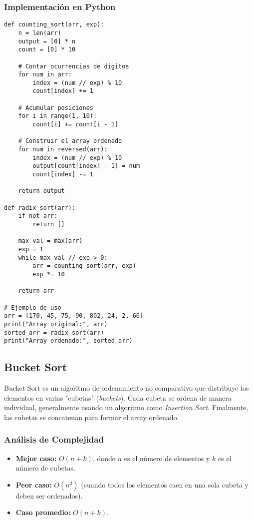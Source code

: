 \documentclass[11pt,openany]{book}
\begin{document}
\subsubsection{Implementación en Python}
\lstset{language=Python}
\begin{lstlisting}
def counting_sort(arr, exp):
    n = len(arr)
    output = [0] * n
    count = [0] * 10

    # Contar ocurrencias de digitos
    for num in arr:
        index = (num // exp) % 10
        count[index] += 1

    # Acumular posiciones
    for i in range(1, 10):
        count[i] += count[i - 1]

    # Construir el array ordenado
    for num in reversed(arr):
        index = (num // exp) % 10
        output[count[index] - 1] = num
        count[index] -= 1

    return output

def radix_sort(arr):
    if not arr:
        return []

    max_val = max(arr)
    exp = 1
    while max_val // exp > 0:
        arr = counting_sort(arr, exp)
        exp *= 10

    return arr

# Ejemplo de uso
arr = [170, 45, 75, 90, 802, 24, 2, 66]
print("Array original:", arr)
sorted_arr = radix_sort(arr)
print("Array ordenado:", sorted_arr)
\end{lstlisting}


\subsection{Bucket Sort}
Bucket Sort es un algoritmo de ordenamiento no comparativo que distribuye los elementos en varias "cubetas" (\textit{buckets}). Cada cubeta se ordena de manera individual, generalmente usando un algoritmo como \textit{Insertion Sort}. Finalmente, las cubetas se concatenan para formar el array ordenado.

\subsubsection{Análisis de Complejidad}
\begin{itemize}
    \item \textbf{Mejor caso:} $O(n + k)$, donde $n$ es el número de elementos y $k$ es el número de cubetas.
    \item \textbf{Peor caso:} $O(n^2)$ (cuando todos los elementos caen en una sola cubeta y deben ser ordenados).
    \item \textbf{Caso promedio:} $O(n + k)$.
\end{itemize}
\end{document}
